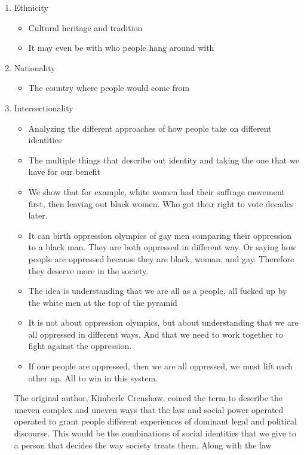 \documentclass{article}
\begin{document}
\begin{enumerate}
  \item Ethnicity
    \begin{itemize}
      \item Cultural heritage and tradition
      \item It may even be with who people hang around with
    \end{itemize}
  \item Nationality
    \begin{itemize}
      \item The country where people would come from
    \end{itemize}
  \item Intersectionality
    \begin{itemize}
      \item Analyzing the different approaches
        of how people take on different identities
      \item The multiple things that describe
        out identity and taking the one that we have
        for our benefit
      \item We show that for example, white women had their
        suffrage movement first,
        then leaving out black women. Who
        got their right to vote decades later.
      \item It can birth oppression olympics of gay men comparing their 
        oppression to a black man. They are both oppressed in different
        way.
        Or saying how people are oppressed because they are
        black, woman, and gay. 
        Therefore they deserve more in the society.
      \item The idea is understanding that we are all as a people, all
        fucked up by the white men at the top of the 
        pyramid
      \item It is not about oppression olympics, but about
        understanding that we are all oppressed in different ways.
        And that we need to work together to fight against the 
        oppression.
      \item If one people are oppressed, then we are all oppressed,
        we must lift each other up.
        All to win in this system.
    \end{itemize}
    The original author, Kimberle Crenshaw, coined the term
    to describe the uneven complex and uneven ways that the law
    and social power operated operated to grant people
    different experiences of dominant legal and political discourse.
    This would be the combinations of social
    identities that we give to a person that decides
    the way society treats them. Along with the law
\end{enumerate}
\end{document}
